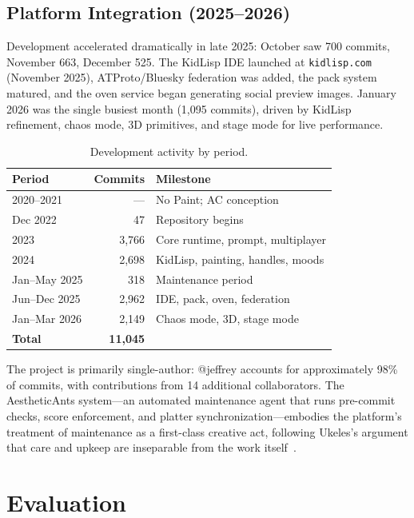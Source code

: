 \documentclass[10pt,letterpaper,twocolumn]{article}
\begin{document}
\subsection{Platform Integration (2025--2026)}

Development accelerated dramatically in late 2025: October saw 700 commits, November 663, December 525. The KidLisp IDE launched at \texttt{kidlisp.com} (November 2025), ATProto/Bluesky federation was added, the pack system matured, and the oven service began generating social preview images. January 2026 was the single busiest month (1,095 commits), driven by KidLisp refinement, chaos mode, 3D primitives, and stage mode for live performance.

\begin{table}[h]
\small
\centering
\begin{tabular}{lrl}
\toprule
\textbf{Period} & \textbf{Commits} & \textbf{Milestone} \\
\midrule
2020--2021 & --- & No Paint; AC conception \\
Dec 2022 & 47 & Repository begins \\
2023 & 3{,}766 & Core runtime, prompt, multiplayer \\
2024 & 2{,}698 & KidLisp, painting, handles, moods \\
Jan--May 2025 & 318 & Maintenance period \\
Jun--Dec 2025 & 2{,}962 & IDE, pack, oven, federation \\
Jan--Mar 2026 & 2{,}149 & Chaos mode, 3D, stage mode \\
\midrule
\textbf{Total} & \textbf{11{,}045} & \\
\bottomrule
\end{tabular}
\caption{Development activity by period.}
\label{tab:history}
\end{table}

The project is primarily single-author: @jeffrey accounts for approximately 98\% of commits, with contributions from 14 additional collaborators. The AestheticAnts system---an automated maintenance agent that runs pre-commit checks, score enforcement, and platter synchronization---embodies the platform's treatment of maintenance as a first-class creative act, following Ukeles's argument that care and upkeep are inseparable from the work itself~\citep{ukeles1969manifesto}.


\section{Evaluation}
\label{sec:evaluation}
\end{document}
